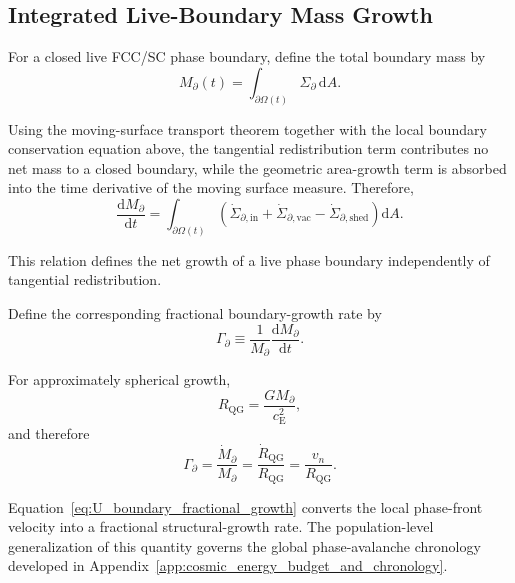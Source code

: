 \subsection{Integrated Live-Boundary Mass Growth}

For a closed live FCC/SC phase boundary, define the total boundary mass by
\begin{equation}
    M_{\partial}(t)
    =
    \int_{\partial\Omega(t)}
    \Sigma_{\partial}\,\mathrm dA.
\end{equation}

Using the moving-surface transport theorem together with the local boundary
conservation equation above, the tangential redistribution term contributes
no net mass to a closed boundary, while the geometric area-growth term is
absorbed into the time derivative of the moving surface measure. Therefore,
\begin{equation}
    \boxed{
    \frac{\mathrm dM_{\partial}}{\mathrm dt}
    =
    \int_{\partial\Omega(t)}
    \left(
        \dot\Sigma_{\partial,\mathrm{in}}
        +
        \dot\Sigma_{\partial,\mathrm{vac}}
        -
        \dot\Sigma_{\partial,\mathrm{shed}}
    \right)
    \mathrm dA.
    }
    \label{eq:U_integrated_boundary_mass}
\end{equation}

This relation defines the net growth of a live phase boundary independently
of tangential redistribution.

Define the corresponding fractional boundary-growth rate by
\begin{equation}
    \boxed{
    \Gamma_{\partial}
    \equiv
    \frac{1}{M_{\partial}}
    \frac{\mathrm dM_{\partial}}{\mathrm dt}.
    }
    \label{eq:U_boundary_growth_rate}
\end{equation}

For approximately spherical growth,
\begin{equation}
    R_{\mathrm{QG}}
    =
    \frac{GM_{\partial}}{c_{\mathrm E}^{2}},
\end{equation}
and therefore
\begin{equation}
    \boxed{
    \Gamma_{\partial}
    =
    \frac{\dot M_{\partial}}{M_{\partial}}
    =
    \frac{\dot R_{\mathrm{QG}}}{R_{\mathrm{QG}}}
    =
    \frac{v_n}{R_{\mathrm{QG}}}.
    }
    \label{eq:U_boundary_fractional_growth}
\end{equation}

Equation~\eqref{eq:U_boundary_fractional_growth} converts the local
phase-front velocity into a fractional structural-growth rate. The
population-level generalization of this quantity governs the global
phase-avalanche chronology developed in
Appendix~\ref{app:cosmic_energy_budget_and_chronology}.

